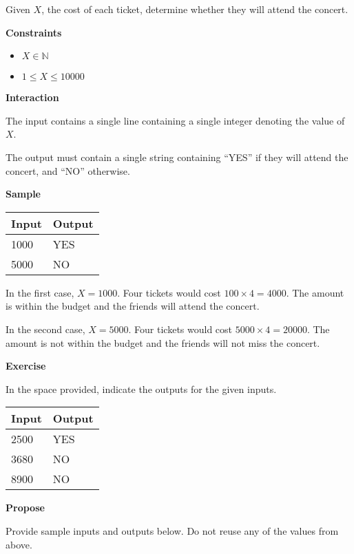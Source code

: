 \documentclass[a4paper]{exam}
\newcommand\heading[1]{\textbf{#1}}
\newcommand\inn{\in \mathbb{N}}
\begin{document}
\begin{questions}
    Given $X$, the cost of each ticket, determine whether they will attend the concert.

    \heading{Constraints}
    \begin{itemize}
        \item $X \inn$
        \item $1 \le X \le 10000$
    \end{itemize}


    \heading{Interaction}

    The input contains a single line containing a single integer denoting the value of $X$.

    The output must contain a single string containing ``YES'' if they will attend the concert, and ``NO'' otherwise.

    \heading{Sample}

    \begin{tabularx}{\textwidth}{|X|X|}
        \rowcolor{gray!50}
        \hline
        Input & Output \\ \hline\hline
        1000   & YES    \\\hline
        5000  & NO     \\\hline
    \end{tabularx}

    In the first case, $X=1000$. Four tickets would cost $100\times 4=4000$. The amount is within the budget and the friends will attend the concert.

        In the second case, $X=5000$. Four tickets would cost $5000\times 4=20000$. The amount is not within the budget and the friends will not miss the concert.

    \heading{Exercise}

    In the space provided, indicate the outputs for the given inputs.

    \begin{tabularx}{\textwidth}{|X|X|}
        \rowcolor{gray!50}
        \hline
        Input & Output \\ \hline\hline
        2500   & YES    \\\hline
        3680   & NO     \\\hline
        8900   & NO     \\\hline
    \end{tabularx}

    \heading{Propose}

    Provide sample inputs and outputs below. Do not reuse any of the values from above.


\end{questions}
\end{document}
